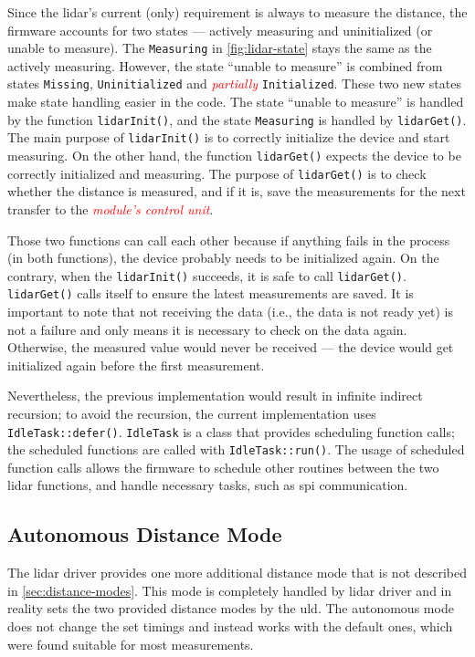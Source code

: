 \documentclass[
  digital,     %
  oneside,     %
  nosansbold,  %
  nocolorbold, %
  nolof,         %
  nolot,         %
]{fithesis4}
\newcommand{\TODO}[1]{\textcolor{red}{\textit{#1}}}
\begin{document}
{{{Since the \acrshort{lidar}'s current (only) requirement is always to measure the distance, the firmware accounts for two states --- actively measuring and uninitialized (or unable to measure). The \verb|Measuring| in \autoref{fig:lidar-state} stays the same as the actively measuring. However, the state ``unable to measure'' is combined from states \verb|Missing|, \verb|Uninitialized| and \TODO{partially} \verb|Initialized|. These two new states make state handling easier in the code. The state ``unable to measure'' is handled by the function \lstinline|lidarInit()|, and the state \verb|Measuring| is handled by \lstinline|lidarGet()|. The main purpose of \lstinline|lidarInit()| is to correctly initialize the device and start measuring. On the other hand, the function \lstinline|lidarGet()| expects the device to be correctly initialized and measuring. The purpose of \lstinline|lidarGet()| is to check whether the distance is measured, and if it is, save the measurements for the next transfer to the \TODO{module's control unit}.

Those two functions can call each other because if anything fails in the process (in both functions), the device probably needs to be initialized again. On the contrary, when the \lstinline|lidarInit()| succeeds, it is safe to call \lstinline|lidarGet()|. \lstinline|lidarGet()| calls itself to ensure the latest measurements are saved. It is important to note that not receiving the data (i.e., the data is not ready yet) is not a failure and only means it is necessary to check on the data again. Otherwise, the measured value would never be received --- the device would get initialized again before the first measurement.

Nevertheless, the previous implementation would result in infinite indirect recursion; to avoid the recursion, the current implementation uses \lstinline|IdleTask::defer()|. \lstinline|IdleTask| is a class that provides scheduling function calls; the scheduled functions are called with \lstinline[breaklines=false]|IdleTask::run()|. The usage of scheduled function calls allows the firmware to schedule other routines between the two lidar functions, and handle necessary tasks, such as \acrshort{spi} communication.

\subsection{ Autonomous Distance Mode } \label{sec:lidar-autonomous}

The \acrshort{lidar} driver provides one more additional distance mode that is not described in \autoref{sec:distance-modes}. This mode is completely handled by \acrshort{lidar} driver and in reality sets the two provided distance modes by the \acrshort{uld}. The autonomous mode does not change the set timings and instead works with the default ones, which were found suitable for most measurements.

}}}
\end{document}
